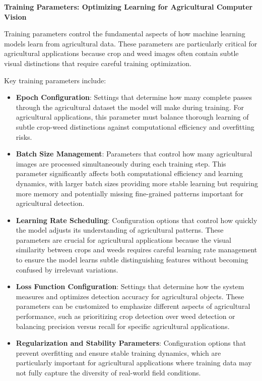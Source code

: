 \textbf{Training Parameters: Optimizing Learning for Agricultural Computer Vision}

Training parameters control the fundamental aspects of how machine learning models learn from agricultural data. These parameters are particularly critical for agricultural applications because crop and weed images often contain subtle visual distinctions that require careful training optimization.

Key training parameters include:

\begin{itemize}
    \item \textbf{Epoch Configuration}: Settings that determine how many complete passes through the agricultural dataset the model will make during training. For agricultural applications, this parameter must balance thorough learning of subtle crop-weed distinctions against computational efficiency and overfitting risks.
    
    \item \textbf{Batch Size Management}: Parameters that control how many agricultural images are processed simultaneously during each training step. This parameter significantly affects both computational efficiency and learning dynamics, with larger batch sizes providing more stable learning but requiring more memory and potentially missing fine-grained patterns important for agricultural detection.
    
    \item \textbf{Learning Rate Scheduling}: Configuration options that control how quickly the model adjusts its understanding of agricultural patterns. These parameters are crucial for agricultural applications because the visual similarity between crops and weeds requires careful learning rate management to ensure the model learns subtle distinguishing features without becoming confused by irrelevant variations.
    
    \item \textbf{Loss Function Configuration}: Settings that determine how the system measures and optimizes detection accuracy for agricultural objects. These parameters can be customized to emphasize different aspects of agricultural performance, such as prioritizing crop detection over weed detection or balancing precision versus recall for specific agricultural applications.
    
    \item \textbf{Regularization and Stability Parameters}: Configuration options that prevent overfitting and ensure stable training dynamics, which are particularly important for agricultural applications where training data may not fully capture the diversity of real-world field conditions.
\end{itemize}

